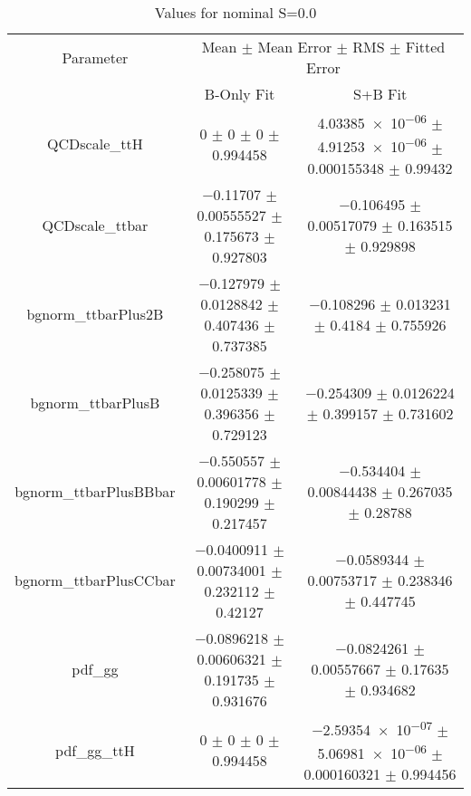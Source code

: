 \begin{table}
\centering
\caption{Values for nominal S=0.0}
\begin{tabular}{ccc}
\toprule
Parameter & \multicolumn{2}{c}{Mean $\pm$ Mean Error $\pm$ RMS $\pm$ Fitted Error}\\
 & B-Only Fit & S+B Fit\\
\midrule
QCDscale\_ttH & \num{0} $\pm$ \num{0} $\pm$ \num{0} $\pm$ \num{0.994458} & \num{4.03385e-06} $\pm$ \num{4.91253e-06} $\pm$ \num{0.000155348} $\pm$ \num{0.99432}\\
QCDscale\_ttbar & \num{-0.11707} $\pm$ \num{0.00555527} $\pm$ \num{0.175673} $\pm$ \num{0.927803} & \num{-0.106495} $\pm$ \num{0.00517079} $\pm$ \num{0.163515} $\pm$ \num{0.929898}\\
bgnorm\_ttbarPlus2B & \num{-0.127979} $\pm$ \num{0.0128842} $\pm$ \num{0.407436} $\pm$ \num{0.737385} & \num{-0.108296} $\pm$ \num{0.013231} $\pm$ \num{0.4184} $\pm$ \num{0.755926}\\
bgnorm\_ttbarPlusB & \num{-0.258075} $\pm$ \num{0.0125339} $\pm$ \num{0.396356} $\pm$ \num{0.729123} & \num{-0.254309} $\pm$ \num{0.0126224} $\pm$ \num{0.399157} $\pm$ \num{0.731602}\\
bgnorm\_ttbarPlusBBbar & \num{-0.550557} $\pm$ \num{0.00601778} $\pm$ \num{0.190299} $\pm$ \num{0.217457} & \num{-0.534404} $\pm$ \num{0.00844438} $\pm$ \num{0.267035} $\pm$ \num{0.28788}\\
bgnorm\_ttbarPlusCCbar & \num{-0.0400911} $\pm$ \num{0.00734001} $\pm$ \num{0.232112} $\pm$ \num{0.42127} & \num{-0.0589344} $\pm$ \num{0.00753717} $\pm$ \num{0.238346} $\pm$ \num{0.447745}\\
pdf\_gg & \num{-0.0896218} $\pm$ \num{0.00606321} $\pm$ \num{0.191735} $\pm$ \num{0.931676} & \num{-0.0824261} $\pm$ \num{0.00557667} $\pm$ \num{0.17635} $\pm$ \num{0.934682}\\
pdf\_gg\_ttH & \num{0} $\pm$ \num{0} $\pm$ \num{0} $\pm$ \num{0.994458} & \num{-2.59354e-07} $\pm$ \num{5.06981e-06} $\pm$ \num{0.000160321} $\pm$ \num{0.994456}\\
\bottomrule
\end{tabular}
\end{table}